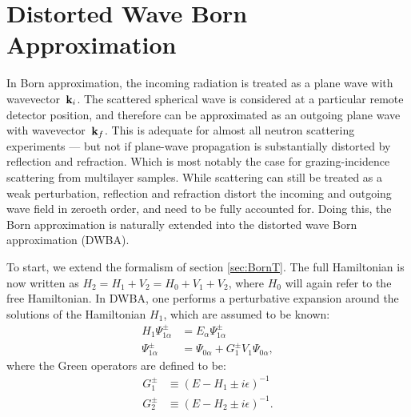 \section{Distorted Wave Born Approximation} 

In Born approximation,
the incoming radiation is treated as a plane wave
with wavevector~$\mathbf{k}_i$.
The scattered spherical wave is considered
at a particular remote detector position,
and therefore can be approximated as an outgoing plane wave
with wavevector~$\mathbf{k}_f$.
This is adequate for almost all neutron scattering experiments ---
but not if plane-wave propagation is substantially distorted
by reflection and refraction.
Which is most notably the case
for grazing-incidence scattering from multilayer samples.
While scattering can still be treated as a weak perturbation,
reflection and refraction distort the incoming and outgoing wave field
in zeroeth order,
and need to be fully accounted for.
Doing this, the Born approximation is naturally extended into
the distorted wave Born approximation (DWBA).

To start, we extend the formalism of section \ref{sec:BornT}.
The full Hamiltonian is now written as $H_2 = H_1 + V_2 = H_0 +V_1 + V_2$,
where $H_0$ will again refer to the free Hamiltonian.
In DWBA,
one performs a perturbative expansion
around the solutions of the Hamiltonian $H_1$,
which are assumed to be known:
\begin{align*}
  H_1\Psi^\pm_{1\alpha} &= E_\alpha\Psi^\pm_{1\alpha} \\
  \Psi^\pm_{1\alpha} &= \Psi_{0\alpha} + G^\pm_1 V_1 \Psi_{0\alpha},
\end{align*}
where the Green operators are defined to be:
\begin{align*}
  G^\pm_1 &\equiv (E-H_1\pm i\epsilon) ^{-1} \nonumber \\
  G^\pm_2 &\equiv (E-H_2\pm i\epsilon) ^{-1}.
\end{align*}

